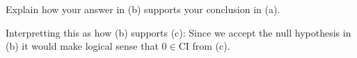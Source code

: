 Explain how your answer in (b) supports your conclusion in (a).

\soln* Interpretting this as how (b) supports (c): Since we accept the null hypothesis in (b) it would make logical sense that $0 \in \text{CI}$ from (c).
